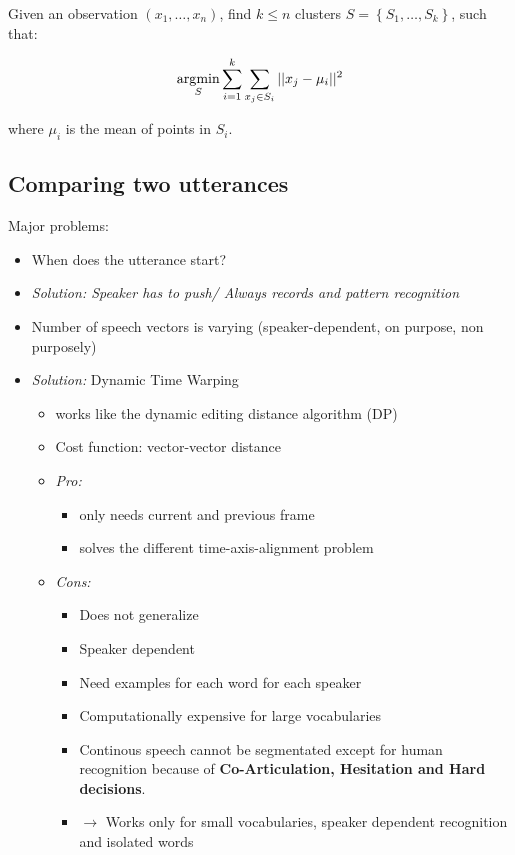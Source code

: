 Given an observation $(x_1, \ldots, x_n)$, find $k \leq n$ clusters $S = \left\{S_1, \ldots, S_k\right\}$, such that:

\[
    \operatorname*{\arg\!\min}_S \sum\limits_{i = 1}^k \sum\limits_{x_j \in S_i} ||x_j - \mu_i||^2
\]

where $\mu_i$ is the mean of points in $S_i$.

\subsection{Comparing two utterances}

Major problems:
\begin{itemize}
\item When does the utterance start?
\item \emph{Solution: Speaker has to push/ Always records and pattern recognition}
\item Number of speech vectors is varying (speaker-dependent, on purpose, non purposely)


\item \emph{Solution:} Dynamic Time Warping

    \begin{itemize}
    \item works like the dynamic editing distance algorithm (DP)
    \item Cost function: vector-vector distance
    \item \emph{Pro:} 
    \begin{itemize}
    \item only needs current and previous frame 
    \item solves the different time-axis-alignment problem
    \end{itemize}
    
    \item{\emph{Cons:}}
    \begin{itemize}
    \item Does not generalize
    \item Speaker dependent
    \item Need examples for each word for each speaker
    \item Computationally expensive for large vocabularies
    \item Continous speech cannot be segmentated except for human recognition because of \textbf{Co-Articulation, Hesitation and Hard decisions}.
    \item $\rightarrow$ Works only for small vocabularies, speaker dependent recognition and isolated words
    \end{itemize}

\end{itemize}

    \end{itemize}

